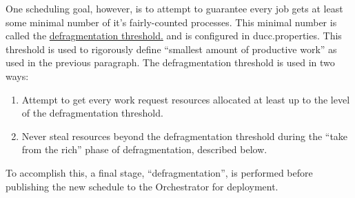    One scheduling goal, however, is to attempt to guarantee every job gets
    at least some minimal number of it's fairly-counted processes.  This minimal number
    is called the 
    \hyperref[itm:props-rm.defragmentation.threshold]{defragmentation threshold.} and
    is configured in ducc.properties.  This threshold is used to rigorously define
    ``smallest amount of productive work'' as used in the previous paragraph.
    The defragmentation threshold is used in
    two ways:

    \begin{enumerate}
      \item Attempt to get every work request resources allocated at least up
        to the level of the defragmentation threshold.
      \item Never steal resources beyond the defragmentation threshold during
        the ``take from the rich'' phase of defragmentation, described below.
    \end{enumerate}
    To accomplish this, a final stage, ``defragmentation'', is
    performed before publishing the new schedule to the Orchestrator
    for deployment.

